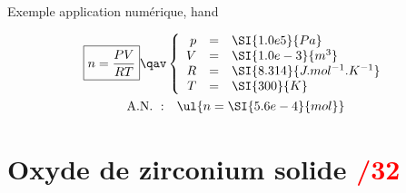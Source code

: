 \documentclass[11pt]{book}
\begin{document}
{\begin{timpo}{Exemple application numérique, hand}
	\vspace*{-10pt}
	\begin{minipage}{0.45\linewidth}
		\begin{gather*}
			\boxed{n = \frac{PV}{RT}}
			\qav
			\left\{
			\begin{array}{rcl}
				p & = & \SI{1.0e5}{Pa}                \\
				V & = & \SI{1.0e-3}{m^3}              \\
				R & = & \SI{8.314}{J.mol^{-1}.K^{-1}} \\
				T & = & \SI{300}{K}
			\end{array}
			\right.\\
			\mathrm{A.N.~:}\quad
			\ul{n = \SI{5.6e-4}{mol}}
		\end{gather*}
	\end{minipage}
	\hfill
\end{timpo}
\newpage
}

\section{Oxyde de zirconium solide \hfill \textcolor{red}{/32}}
\label{sec:oxzir}
\end{document}
